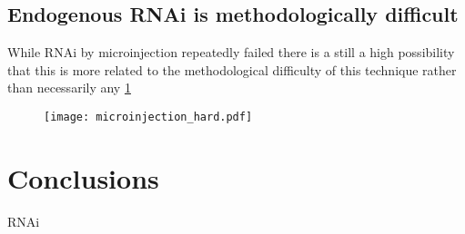 \subsection{Endogenous RNAi is methodologically difficult}


While RNAi by microinjection repeatedly failed there is a still a high possibility
that this is more related to the methodological difficulty of this technique rather than
necessarily any 
\cref{fig:microinjection_nucleus}

\begin{figure}
    \texttt{[image: microinjection\_hard.pdf]}
    \caption{}
    \label{fig:microinjection_nucleus}
\end{figure}






\section{Conclusions}

RNAi 
